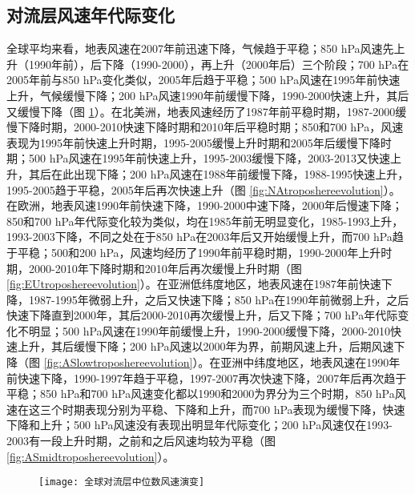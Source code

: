 \subsection{对流层风速年代际变化}

全球平均来看，地表风速在2007年前迅速下降，气候趋于平稳；850 hPa风速先上升（1990年前），后下降（1990-2000），再上升（2000年后）三个阶段；700 hPa在2005年前与850 hPa变化类似，2005年后趋于平稳；500 hPa风速在1995年前快速上升，气候缓慢下降；200 hPa风速1990年前缓慢下降，1990-2000快速上升，其后又缓慢下降（图 \ref{fig:globaltroposhereevolution}）。在北美洲，地表风速经历了1987年前平稳时期，1987-2000缓慢下降时期，2000-2010快速下降时期和2010年后平稳时期；850和700 hPa，风速表现为1995年前快速上升时期，1995-2005缓慢上升时期和2005年后缓慢下降时期；500 hPa风速在1995年前快速上升，1995-2003缓慢下降，2003-2013又快速上升，其后在此出现下降；200 hPa风速在1988年前缓慢下降，1988-1995快速上升，1995-2005趋于平稳，2005年后再次快速上升（图 \ref{fig:NAtroposhereevolution}）。在欧洲，地表风速1990年前快速下降，1990-2000中速下降，2000年后慢速下降；850和700 hPa年代际变化较为类似，均在1985年前无明显变化，1985-1993上升，1993-2003下降，不同之处在于850 hPa在2003年后又开始缓慢上升，而700 hPa趋于平稳；500和200 hPa，风速均经历了1990年前平稳时期，1990-2000年上升时期，2000-2010年下降时期和2010年后再次缓慢上升时期（图 \ref{fig:EUtroposhereevolution}）。在亚洲低纬度地区，地表风速在1987年前快速下降，1987-1995年微弱上升，之后又快速下降；850 hPa在1990年前微弱上升，之后快速下降直到2000年，其后2000-2010再次缓慢上升，后又下降；700 hPa年代际变化不明显；500 hPa风速在1990年前缓慢上升，1990-2000缓慢下降，2000-2010快速上升，其后缓慢下降；200 hPa风速以2000年为界，前期风速上升，后期风速下降（图 \ref{fig:ASlowtroposhereevolution}）。在亚洲中纬度地区，地表风速在1990年前快速下降，1990-1997年趋于平稳，1997-2007再次快速下降，2007年后再次趋于平稳；850 hPa和700 hPa风速变化都以1990和2000为界分为三个时期，850 hPa风速在这三个时期表现分别为平稳、下降和上升，而700 hPa表现为缓慢下降，快速下降和上升；500 hPa风速没有表现出明显年代际变化；200 hPa风速仅在1993-2003有一段上升时期，之前和之后风速均较为平稳（图 \ref{fig:ASmidtroposhereevolution}）。

\begin{figure}[!htbp]
    \centering
    \texttt{[image: 全球对流层中位数风速演变]}
    \label{fig:globaltroposhereevolution}
\end{figure}

